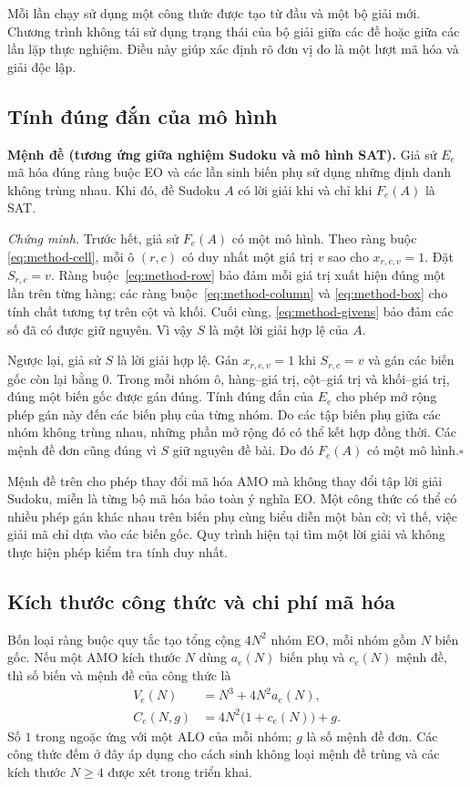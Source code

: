 \documentclass[a4paper,fleqn]{cas-sc}
\begin{document}
Mỗi lần chạy sử dụng một công thức được tạo từ đầu và một bộ giải mới.
Chương trình không tái sử dụng trạng thái của bộ giải giữa các đề hoặc
giữa các lần lặp thực nghiệm. Điều này giúp xác định rõ đơn vị đo là
một lượt mã hóa và giải độc lập.

\subsection{Tính đúng đắn của mô hình}

\noindent\textbf{Mệnh đề (tương ứng giữa nghiệm Sudoku và mô hình SAT).}
Giả sử $E_e$ mã hóa đúng ràng buộc EO và các lần sinh biến phụ sử dụng
những định danh không trùng nhau. Khi đó, đề Sudoku $A$ có lời giải
khi và chỉ khi $F_e(A)$ là SAT.

\textit{Chứng minh.}
Trước hết, giả sử $F_e(A)$ có một mô hình. Theo ràng buộc
\eqref{eq:method-cell}, mỗi ô $(r,c)$ có duy nhất một giá trị $v$ sao
cho $x_{r,c,v}=1$. Đặt $S_{r,c}=v$.
Ràng buộc~\eqref{eq:method-row} bảo đảm mỗi giá trị xuất hiện đúng
một lần trên từng hàng; các ràng buộc~\eqref{eq:method-column} và
\eqref{eq:method-box} cho tính chất tương tự trên cột và khối.
Cuối cùng, \eqref{eq:method-givens} bảo đảm các số đã có được giữ nguyên.
Vì vậy $S$ là một lời giải hợp lệ của $A$.

Ngược lại, giả sử $S$ là lời giải hợp lệ. Gán $x_{r,c,v}=1$ khi
$S_{r,c}=v$ và gán các biến gốc còn lại bằng $0$.
Trong mỗi nhóm ô, hàng--giá trị, cột--giá trị và khối--giá trị, đúng một
biến gốc được gán đúng. Tính đúng đắn của $E_e$ cho phép mở rộng phép
gán này đến các biến phụ của từng nhóm. Do các tập biến phụ giữa các
nhóm không trùng nhau, những phần mở rộng đó có thể kết hợp đồng thời.
Các mệnh đề đơn cũng đúng vì $S$ giữ nguyên đề bài. Do đó
$F_e(A)$ có một mô hình.\hfill$\square$

Mệnh đề trên cho phép thay đổi mã hóa AMO mà không thay đổi tập lời giải
Sudoku, miễn là từng bộ mã hóa bảo toàn ý nghĩa EO. Một công thức có
thể có nhiều phép gán khác nhau trên biến phụ cùng biểu diễn một bàn
cờ; vì thế, việc giải mã chỉ dựa vào các biến gốc. Quy trình hiện tại
tìm một lời giải và không thực hiện phép kiểm tra tính duy nhất.

\subsection{Kích thước công thức và chi phí mã hóa}

Bốn loại ràng buộc quy tắc tạo tổng cộng $4N^2$ nhóm EO, mỗi nhóm gồm
$N$ biến gốc. Nếu một AMO kích thước $N$ dùng $a_e(N)$ biến phụ và
$c_e(N)$ mệnh đề, thì số biến và mệnh đề của công thức là
\begin{align}
 V_e(N)&=N^3+4N^2a_e(N),
 \label{eq:method-variable-count}\\
 C_e(N,g)&=4N^2\bigl(1+c_e(N)\bigr)+g.
 \label{eq:method-clause-count}
\end{align}
Số $1$ trong ngoặc ứng với một ALO của mỗi nhóm; $g$ là số mệnh đề đơn.
Các công thức đếm ở đây áp dụng cho cách sinh không loại mệnh đề trùng
và các kích thước $N\geq4$ được xét trong triển khai.
\end{document}
